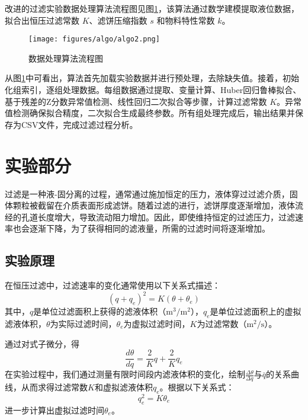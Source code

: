 \documentclass[UTF8,a4paper,fontset=none]{ctexart}
\begin{document}
改进的过滤实验数据处理算法流程图见图\ref{fig:algo2}，该算法通过数学建模提取液位数据，拟合出恒压过滤常数 $K$、滤饼压缩指数 $s$ 和物料特性常数 $k$。

\begin{figure}[H]
    \centering
    \texttt{[image: figures/algo/algo2.png]}
    \caption{数据处理算法流程图}
    \label{fig:algo2}
\end{figure}

从图\ref{fig:algo2}中可看出，算法首先加载实验数据并进行预处理，去除缺失值。接着，初始化组索引，逐组处理数据。每组数据通过提取、变量计算、Huber回归鲁棒拟合、基于残差的Z分数异常值检测、线性回归二次拟合等步骤，计算过滤常数 $K$。异常值检测确保拟合精度，二次拟合生成最终参数。所有组处理完成后，输出结果并保存为CSV文件，完成过滤过程分析。


\section{实验部分}


过滤是一种液-固分离的过程，通常通过施加恒定的压力，液体穿过过滤介质，固体颗粒被截留在介质表面形成滤饼。随着过滤的进行，滤饼厚度逐渐增加，液体流经的孔道长度增大，导致流动阻力增加。因此，即使维持恒定的过滤压力，过滤速率也会逐渐下降，为了获得相同的滤液量，所需的过滤时间将逐渐增加。

\subsection{实验原理}


在恒压过滤中，过滤速率的变化通常使用以下关系式描述：
\begin{equation}
(q + q_{e})^2 = K (\theta + \theta_{e})
\end{equation}
其中，$q$是单位过滤面积上获得的滤液体积（$\mathrm{m}^3/\mathrm{m}^2$），$q_{e}$是单位过滤面积上的虚拟滤液体积，$\theta$为实际过滤时间，$\theta_{e}$为虚拟过滤时间，$K$为过滤常数（$\mathrm{m}^2/\mathrm{s}$）。

通过对式子微分，得
\begin{equation}
\frac{d\theta}{dq} = \frac{2}{K} q + \frac{2}{K} q_{e}
\end{equation}
在实验过程中，我们通过测量有限时间段内滤液体积的变化，绘制$\frac{\Delta \theta}{\Delta q}$与$\bar{q}$的关系曲线，从而求得过滤常数$K$和虚拟滤液体积$q_{e}$。根据以下关系式：
\begin{equation}
q_{e}^2 = K\theta_{e}
\end{equation}
进一步计算出虚拟过滤时间$\theta_{e}$。
\end{document}
